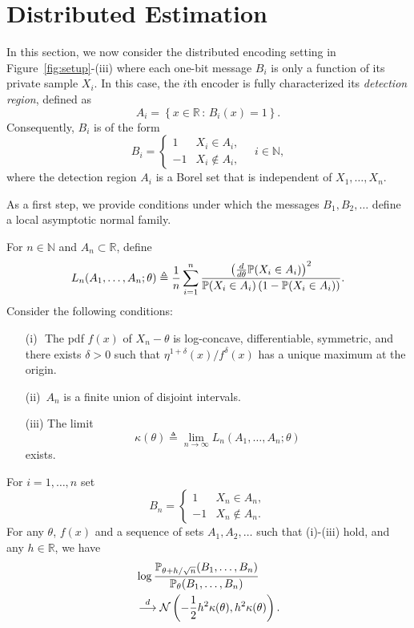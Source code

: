 \section{Distributed Estimation \label{sec:distributed}}
In this section, we now consider the distributed encoding setting in Figure~\ref{fig:setup}-(iii) where  each one-bit message $B_i$ is only a function of its private sample $X_i$. In this case, the $i$th encoder is fully characterized its \emph{detection region}, defined as 
\[
A_i = \left\{ x \in \mathbb R \,:\, B_i(x) = 1 \right\}.
\]
Consequently, $B_i$ is of the form
\[
B_i = \begin{cases} 1 & X_i \in A_i, \\
-1 & X_i \notin A_i,
\end{cases} \quad i\in \mathbb N,
\]
where the detection region $A_i$ is a Borel set that is independent of $X_1,\ldots,X_n$.\par

As a first step, we provide conditions under which the messages $B_1,B_2,\ldots$ define a local asymptotic normal family. 

\begin{thm} \label{thm:LAN1}
For $n \in \mathbb N$ and $A_n \subset \mathbb R$,  define
\begin{equation}
\label{eq:precision_general}
L_n(A_1,\ldots,A_n;\theta) \triangleq \frac{1}{n} \sum_{i=1}^n \frac{ \left(\frac{d}{d \theta} \mathbb{P}(X_i \in A_i) \right)^2 }{ \mathbb{P}(X_i \in A_i)\left(1- \mathbb{P}(X_i \in A_i) \right) }. 
\end{equation}
Consider the following conditions:
\begin{itemize}
\item [(i)\,\,] The pdf $f(x)$ of $X_n-\theta$ is log-concave, differentiable, symmetric,  and  there exists $\delta>0$ such that $\eta^{1+\delta}(x)/f^\delta(x)$ has a unique maximum at the origin.
\item[(ii)\,] $A_n$ is a finite union of disjoint intervals.
\item[(iii)] The limit 
\begin{equation}
\label{eq:LAN_lim}
\kappa(\theta) \triangleq \lim_{n\to \infty} L_n(A_1,\ldots,A_n; \theta)
\end{equation}
exists. 
\end{itemize}
For $i=1,\ldots,n$ set
\[
B_n = \begin{cases} 1 & X_n \in A_n, \\
-1 & X_n \notin A_n. 
\end{cases} 
\]
For any $\theta$, $f(x)$ and a sequence of sets $A_1,A_2,\ldots$ such that (i)-(iii) hold, and any $h\in \mathbb R$, we have
\begin{align*}
& \log  \frac{ \mathbb P_{\theta+h/\sqrt{n}} (B_1,\ldots,B_n) }{
\mathbb P_{\theta} (B_1,\ldots,B_n)} \\
& \overset{d}{\longrightarrow} \mathcal{N}\left(-\frac{1}{2} h^2 \kappa(\theta), h^2 \kappa(\theta) \right).
\end{align*} 
\end{thm}

